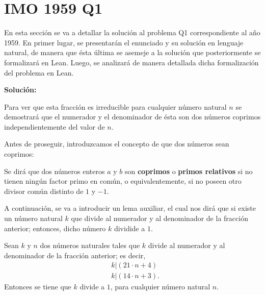 \section{IMO 1959 Q1}

En esta sección se va a detallar la solución al problema Q1
correspondiente al año 1959. En primer lugar, se presentarán el
enunciado y su solución en lenguaje natural, de manera que ésta última
se asemeje a la solución que posteriormente se formalizará en
Lean. Luego, se analizará de manera detallada dicha formalización del
problema en Lean.

\noindent
{}

\textbf{Solución:}

Para ver que esta fracción es irreducible para cualquier número natural
\(n\) se demostrará que el numerador y el denominador de ésta son dos
números coprimos independientemente del valor de \(n\).

Antes de proseguir, introduzcamos el concepto de que dos números sean
coprimos:

\begin{definicion}\label{coprimos}
  Se dirá que dos números enteros \(a\) y \(b\) son \textbf{coprimos}
  o \textbf{primos relativos} si no tienen ningún factor primo en común,
  o equivalentemente, si no poseen otro divisor común distinto de \(1\)
  y \(-1\).
\end{definicion}


A continuación, se va a introducir un lema auxiliar, el cual nos dirá
que si existe un número natural \(k\) que divide al numerador y al
denominador de la fracción anterior; entonces, dicho número \(k\)
dividide a \(1\).

\begin{lema}\label{lema}
  Sean \(k\) y \(n\) dos números naturales tales que \(k\) divide al
  numerador y al denominador de la fracción anterior; es decir,
  \begin{align}
    & k | (21⋅n+4)   \label{k1} \\
    & k | (14⋅n+3).  \label{k2}
  \end{align}
  Entonces se tiene que \(k\) divide a \(1\), para cualquier número
  natural \(n\).
\end{lema}

